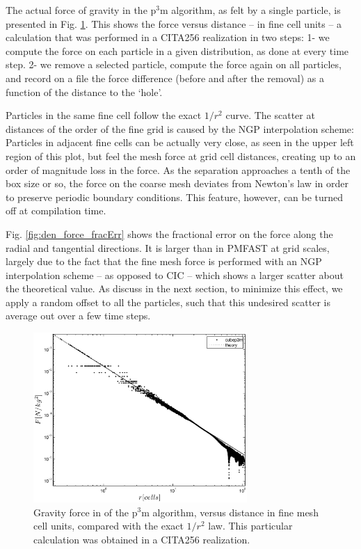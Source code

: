 The actual force of gravity in the p$^3$m algorithm,
as felt by a single particle, is presented in Fig. \ref{fig:den_force_ppext0}.
This shows the force versus distance -- in fine cell units -- a calculation that was performed in a CITA256 realization in two steps: 
1- we compute the force on each particle in a given distribution, as done at every time step.
2- we remove a selected particle, compute the force again on all particles, and record on a file the 
force difference (before  and after the removal) as a function of the distance to the `hole'.

Particles in the same fine cell follow the exact $1/r^{2}$ curve. The scatter at 
  distances of the order of the fine grid is caused by the NGP interpolation scheme:
  Particles in adjacent fine cells can be actually very close, as seen in the upper left region of this plot,
  but feel the mesh force at grid cell distances,
  creating up to an order of magnitude loss in the force.
As the separation approaches a tenth of the box size or so, the force on the coarse mesh deviates
from Newton's law in order to preserve periodic boundary conditions. 
This feature, however, can be turned off at compilation time.


Fig. \ref{fig:den_force_fracErr} shows the fractional error on the force along the radial and tangential directions.
It is larger than in {\small PMFAST} at grid scales, largely due to the fact that the fine mesh force is performed with an NGP interpolation scheme -- as opposed to CIC -- which shows a larger scatter about the theoretical value. 
As discuss in the next section, to minimize this effect, we apply a random offset to all the particles,
such that this undesired scatter is average out over a few time steps.



\begin{figure}%
  \begin{center}
    \includegraphics[width=3.2in]{graphs/densityForce_ppext=0.eps}
  \caption{Gravity force in of the p$^3$m algorithm, versus distance in fine mesh cell units, compared with the exact $1/r^{2}$ law.
    This particular calculation was obtained in a CITA256 realization. 
    \label{fig:den_force_ppext0}}
\end{center}
\end{figure}

